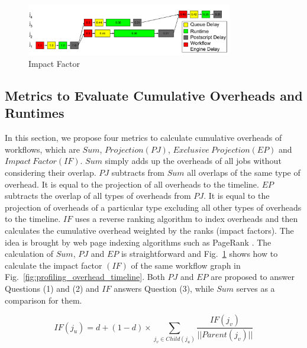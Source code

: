 \begin{figure}[!htb]
	\centering
 \includegraphics[width=0.8\textwidth]{figures/profiling/rr.pdf}
    \caption{Impact Factor}
    \label{fig:profiling_overhead_rr}
\end{figure}


\subsection{Metrics to Evaluate Cumulative Overheads and Runtimes}

In this section, we propose four metrics to calculate cumulative overheads of workflows, which are $Sum$, $Projection(PJ)$, $Exclusive~Projection(EP)$ and $Impact~Factor(IF)$. $Sum$ simply adds up the overheads of all jobs without considering their overlap. $PJ$ subtracts from $Sum$ all overlaps of the same type of overhead. It is equal to the projection of all overheads to the timeline. $EP$ subtracts the overlap of all types of overheads from $PJ$. It is equal to the projection of overheads of a particular type excluding all other types of overheads to the timeline. $IF$ uses a reverse ranking algorithm to index overheads and then calculates the cumulative overhead weighted by the ranks (impact factors). The idea is brought by web page indexing algorithms such as PageRank \cite{PageRank1999}. The calculation of $Sum$, $PJ$ and $EP$ is straightforward and Fig.~\ref{fig:profiling_overhead_rr} shows how to calculate the impact factor $(IF)$ of the same workflow graph in Fig.~\ref{fig:profiling_overhead_timeline}. Both $PJ$ and $EP$ are proposed to answer Questions (1) and (2) and $IF$  answers Question (3), while $Sum$ serves as a comparison for them. 

\begin{equation} \label{eq:profiling_rr}
IF(j_u)=d+(1-d)\times\sum_{j_v\in Child(j_u)}{}\frac{IF(j_v)}{||Parent(j_v)||}
\end{equation}

